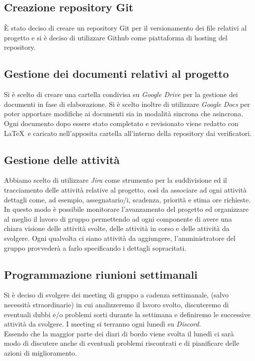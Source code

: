 \documentclass{article}
\begin{document}
    \subsection{Creazione repository Git}
        È stato deciso di creare un repository Git per il versionamento dei file relativi al progetto e
        si è deciso di utilizzare Github come piattaforma di hosting del repository. \subsection{Gestione dei documenti relativi al progetto}
        Si è scelto di creare una cartella condivisa su \textit{Google Drive} per la gestione dei documenti in fase di elaborazione. Si è scelto inoltre di utilizzare \textit{Google Docs} per poter apportare modifiche ai documenti sia in modalità sincrona che asincrona. Ogni documento dopo essere stato completato e revisionato viene redatto con \LaTeX\ e caricato nell’apposita cartella all’interno della repository dai verificatori.
    
    \subsection{Gestione delle attività}
        Abbiamo scelto di utilizzare \textit{Jira} come strumento per la suddivisione ed il tracciamento delle attività relative al progetto, così da associare ad ogni attività dettagli come, ad esempio, assegnatario/i, scadenza, priorità e stima ore richieste. \\
        In questo modo è possibile monitorare l'avanzamento del progetto ed organizzare al meglio il lavoro di gruppo permettendo ad ogni componente di avere una chiara visione delle attività svolte, delle attività in corso e delle attività da svolgere.
        Ogni qualvolta ci siano attività da aggiungere, l’amministratore del gruppo provvederà a farlo specificando i dettagli sopracitati.
    
    \subsection{Programmazione riunioni settimanali}
        Si è deciso di svolgere dei meeting di gruppo a cadenza settimanale, (salvo necessità straordinarie) in cui analizzeremo il lavoro svolto, discuteremo di eventuali dubbi e/o problemi sorti durante la settimana e definiremo le successive attività da svolgere.
        I meeting si terranno ogni lunedì su \textit{Discord}. \\
        Essendo che la maggior parte dei diari di bordo viene svolta il lunedì ci sarà modo di discutere anche di eventuali problemi riscontrati e di pianificare delle azioni di miglioramento.
    
\end{document}
